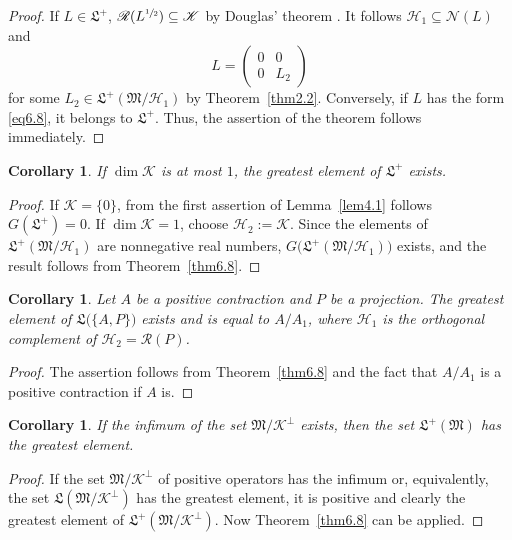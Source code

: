 \documentclass[12pt, a4paper, reqno, twoside]{amsart}
\numberwithin{equation}{section}
\newcommand{\frakL}{\mathfrak L}
\newcommand{\frakM}{\mathfrak M}
\newtheorem{corollary}[theorem]{Corollary}
\theoremstyle{definition}
\theoremstyle{remark}
\theoremstyle{mystyle}
\begin{document}
\begin{proof}
If $L\in\frakL^{+}$, $\mathscr R(L^{\sfrac{1}{2}})\subseteq\mathscr K$
by Douglas' theorem \cite{Douglas1966}. It follows $\mathscr
H_{1}\subseteq\mathscr N(L)$ and
\begin{equation}
\label{eq6.8}
L= \begin{pmatrix} 0&0\\0&L_{2} \end{pmatrix}  
\end{equation}
for some $L_{2}\in\frakL^{+}(\frakM/\mathscr H_{1})$ by
Theorem~\ref{thm2.2}. Conversely, if $L$  has the form \eqref{eq6.8},
it belongs to $\frakL^{+}$. Thus, the assertion of the theorem follows immediately.
\end{proof}

\begin{corollary}
\label{cor6.9}
If $\dim\mathscr K$ is at most $1$, the greatest element of $\frakL^{+}$
exists. 
\end{corollary}

\begin{proof}
If $\mathscr K=\{0\}$, from the first assertion of Lemma~\ref{lem4.1}
follows $G(\frakL^{+})=0$. If $\dim\mathscr K=1$, choose
$\mathscr H_{2}:=\mathscr K$. Since the elements of
$\frakL^{+}(\frakM/\mathscr H_{1})$ are nonnegative real numbers,
$G\bigl(\frakL^{+}(\frakM/\mathscr H_{1})\bigr)$ exists, and the
result follows from Theorem~\ref{thm6.8}. 
\end{proof}

\begin{corollary}
\label{cor6.10}
Let $A$ be a positive contraction and $P$ be a projection. The
greatest element of $\frakL\bigl(\{A,P\}\bigr)$ exists and is equal to
$A/A_{1}$, where $\mathscr H_{1}$ is the orthogonal complement of
$\mathscr H_{2}=\mathscr R(P)$.
\end{corollary}

\begin{proof}
The assertion follows from Theorem~\ref{thm6.8} and the fact that
$A/A_{1}$ is a positive contraction if $A$ is.
\end{proof}

\begin{corollary}
\label{cor6.10a}
If the infimum of the set $\frakM/\mathscr K^{\perp}$ exists, then the
set $\frakL^{+}(\frakM)$ has the greatest element.
\end{corollary}

\begin{proof}
If the set $\frakM/\mathscr K^{\perp}$ of positive operators has the
infimum or, equivalently, the set $\frakL(\frakM/\mathscr K^{\perp})$  
has the greatest element, it is positive and clearly the greatest
element of $\frakL^{+}(\frakM/\mathscr K^{\perp})$. Now
Theorem~\ref{thm6.8} can be applied.
\end{proof}
\end{document}
